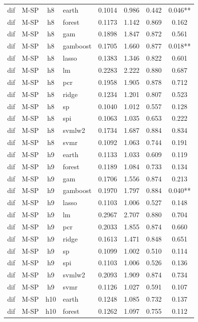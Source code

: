 \begin{ThreePartTable}
\begin{longtable}[t]{llclcccc}
\addlinespace
dif & M-SP & h8 & earth & 0.1014 & 0.986 & 0.442 & 0.046**\\
dif & M-SP & h8 & forest & 0.1173 & 1.142 & 0.869 & 0.162\\
dif & M-SP & h8 & gam & 0.1898 & 1.847 & 0.872 & 0.561\\
dif & M-SP & h8 & gamboost & 0.1705 & 1.660 & 0.877 & 0.018**\\
dif & M-SP & h8 & lasso & 0.1383 & 1.346 & 0.822 & 0.601\\
dif & M-SP & h8 & lm & 0.2283 & 2.222 & 0.880 & 0.687\\
dif & M-SP & h8 & pcr & 0.1958 & 1.905 & 0.878 & 0.712\\
dif & M-SP & h8 & ridge & 0.1234 & 1.201 & 0.807 & 0.523\\
dif & M-SP & h8 & sp & 0.1040 & 1.012 & 0.557 & 0.128\\
dif & M-SP & h8 & spi & 0.1063 & 1.035 & 0.653 & 0.222\\
dif & M-SP & h8 & svmlw2 & 0.1734 & 1.687 & 0.884 & 0.834\\
dif & M-SP & h8 & svmr & 0.1092 & 1.063 & 0.744 & 0.191\\
\addlinespace
dif & M-SP & h9 & earth & 0.1133 & 1.033 & 0.609 & 0.119\\
dif & M-SP & h9 & forest & 0.1189 & 1.084 & 0.733 & 0.134\\
dif & M-SP & h9 & gam & 0.1706 & 1.556 & 0.874 & 0.213\\
dif & M-SP & h9 & gamboost & 0.1970 & 1.797 & 0.884 & 0.040**\\
dif & M-SP & h9 & lasso & 0.1103 & 1.006 & 0.527 & 0.148\\
dif & M-SP & h9 & lm & 0.2967 & 2.707 & 0.880 & 0.704\\
dif & M-SP & h9 & pcr & 0.2033 & 1.855 & 0.874 & 0.660\\
dif & M-SP & h9 & ridge & 0.1613 & 1.471 & 0.848 & 0.651\\
dif & M-SP & h9 & sp & 0.1099 & 1.002 & 0.510 & 0.114\\
dif & M-SP & h9 & spi & 0.1103 & 1.006 & 0.526 & 0.136\\
dif & M-SP & h9 & svmlw2 & 0.2093 & 1.909 & 0.874 & 0.734\\
dif & M-SP & h9 & svmr & 0.1126 & 1.027 & 0.591 & 0.107\\
\addlinespace
dif & M-SP & h10 & earth & 0.1248 & 1.085 & 0.732 & 0.137\\
dif & M-SP & h10 & forest & 0.1262 & 1.097 & 0.755 & 0.112\\

\end{longtable}
\end{ThreePartTable}
